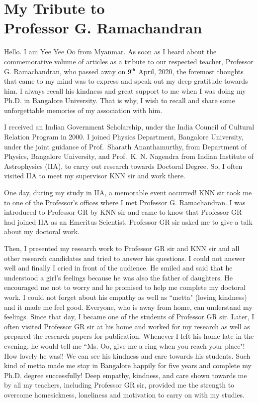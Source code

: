 \chapter[My Tribute to Professor G. Ramachandran]{My Tribute to\\ Professor G. Ramachandran}\label{chap32}



Hello. I am Yee Yee Oo from Myanmar. As soon as I heard about the commemorative volume of articles as a tribute to our respected teacher, Professor G. Ramachandran, who passed away on 9$^{\rm th}$ April, 2020, the foremost thoughts that came to my mind was to express and speak out my deep gratitude towards him. I always recall his kindness and great support to me when I was doing my Ph.D. in Bangalore University. That is why, I wish to recall and share some unforgettable memories of my association with him.  

I received an Indian Government Scholarship, under the India Council of Cultural Relation Program in 2000. I joined Physics Department, Bangalore University, under the joint guidance of Prof.\ Sharath Ananthamurthy, from Department of Physics, Bangalore University, and Prof.\ K. N. Nagendra from Indian Institute of Astrophysics (IIA), to carry out research towards Doctoral Degree. So, I often visited IIA to meet my supervisor KNN sir and work there. 

One day, during my study in IIA, a memorable event occurred! KNN sir took me to one of the Professor's offices where I met Professor G. Ramachandran. I was introduced to Professor GR by KNN sir and came to know that Professor GR had joined IIA as an Emeritus Scientist. Professor GR sir asked me to give a talk about my doctoral work. 

Then, I presented my research work to Professor GR sir and KNN sir and all other research candidates and tried to answer his questions. I could not answer well and finally I cried in front of the audience. He smiled and said that he understood a girl's feelings because he was also the father of daughters. He encouraged me not to worry and he promised to help me complete my doctoral work.  I could not forget about his empathy as well as ``metta" (loving kindness) and it made me feel good. Everyone, who is away from home, can understand my feelings. Since that day, I became one of the students of Professor GR sir. Later, I often visited Professor GR sir at his home and worked for my research as well as prepared the research papers for publication. Whenever I left his home late in the evening, he would tell me ``Ms. Oo, give me a ring when you reach your place"! How lovely he was!! We can see his kindness and care towards his students. Such kind of metta made me stay in Bangalore happily for five years and complete my Ph.D. degree successfully! Deep empathy, kindness, and care shown towards me by all my teachers, including Professor GR sir, provided me the strength to overcome homesickness, loneliness and motivation to carry on with my studies. 

